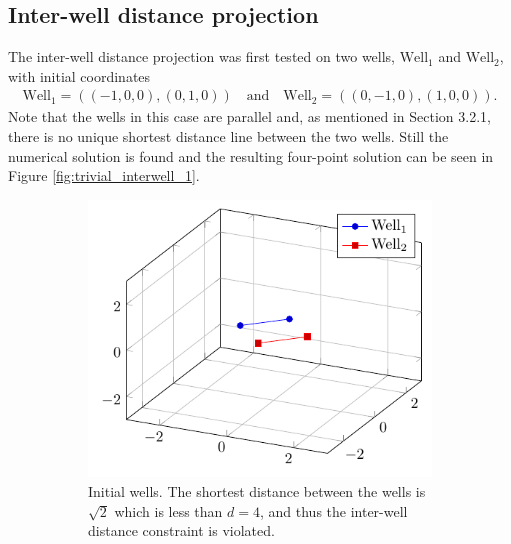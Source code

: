 \subsection{Inter-well distance projection}
%
The inter-well distance projection was first tested on two wells,
$\text{Well}_1$ and $\text{Well}_2$, with initial coordinates 
%
\begin{align*}
\text{Well}_1 = \left( (-1,0,0), (0,1,0) \right) \quad \text{and} \quad  \text{Well}_2 = \left( (0,-1,0), (1,0,0) \right).
\end{align*}
%
Note that the wells in this case are parallel and, as
mentioned in Section 3.2.1, there is no unique shortest 
distance line between the two wells. Still the numerical
solution is found and the resulting four-point solution 
can be seen in Figure \ref{fig:trivial_interwell_1}.
%
\begin{figure}[H]
	\centering
	\begin{subfigure}{0.44\textwidth}
		\centering
		\includegraphics[width=1\textwidth]{figures/interwell_distance_two_wells/initial.pdf}
		\caption{Initial wells. The shortest distance between the wells is $\sqrt{2}$ which is
								 less than $d=4$, and thus the inter-well distance constraint is
								 violated.}
	\end{subfigure}\hfill
	\hspace{.05\linewidth}
	\begin{subfigure}{0.44\textwidth}
		\centering

\end{subfigure}
\end{figure}
